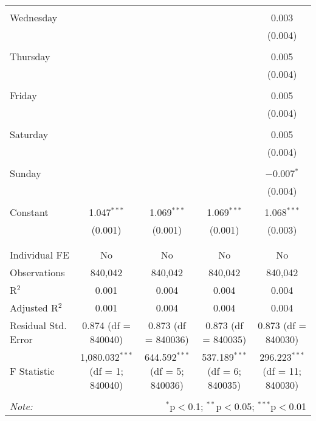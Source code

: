 \documentclass[
]{article}
\begin{document}
\begin{table}[!htbp]
{\begin{tabular}{@{\extracolsep{5pt}}lcccc}
  & & & & \\ 
 Wednesday &  &  &  & 0.003 \\ 
  &  &  &  & (0.004) \\ 
  & & & & \\ 
 Thursday &  &  &  & 0.005 \\ 
  &  &  &  & (0.004) \\ 
  & & & & \\ 
 Friday &  &  &  & 0.005 \\ 
  &  &  &  & (0.004) \\ 
  & & & & \\ 
 Saturday &  &  &  & 0.005 \\ 
  &  &  &  & (0.004) \\ 
  & & & & \\ 
 Sunday &  &  &  & $-$0.007$^{*}$ \\ 
  &  &  &  & (0.004) \\ 
  & & & & \\ 
 Constant & 1.047$^{***}$ & 1.069$^{***}$ & 1.069$^{***}$ & 1.068$^{***}$ \\ 
  & (0.001) & (0.001) & (0.001) & (0.003) \\ 
  & & & & \\ 
\hline \\[-1.8ex] 
Individual FE & No & No & No & No \\ 
Observations & 840,042 & 840,042 & 840,042 & 840,042 \\ 
R$^{2}$ & 0.001 & 0.004 & 0.004 & 0.004 \\ 
Adjusted R$^{2}$ & 0.001 & 0.004 & 0.004 & 0.004 \\ 
Residual Std. Error & 0.874 (df = 840040) & 0.873 (df = 840036) & 0.873 (df = 840035) & 0.873 (df = 840030) \\ 
F Statistic & 1,080.032$^{***}$ (df = 1; 840040) & 644.592$^{***}$ (df = 5; 840036) & 537.189$^{***}$ (df = 6; 840035) & 296.223$^{***}$ (df = 11; 840030) \\ 
\hline 
\hline \\[-1.8ex] 
\textit{Note:}  & \multicolumn{4}{r}{$^{*}$p$<$0.1; $^{**}$p$<$0.05; $^{***}$p$<$0.01} \\ 
\end{tabular}
} 
\end{table} 
\newpage
\end{document}
